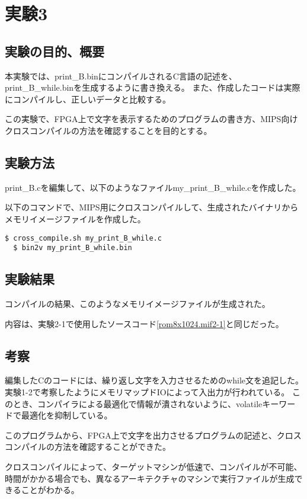 \section{実験3}
\subsection{実験の目的、概要}
本実験では、print\_B.binにコンパイルされるC言語の記述を、print\_B\_while.binを生成するように書き換える。
また、作成したコードは実際にコンパイルし、正しいデータと比較する。

この実験で、FPGA上で文字を表示するためのプログラムの書き方、MIPS向けクロスコンパイルの方法を確認することを目的とする。

\subsection{実験方法}
print\_B.cを編集して、以下のようなファイルmy\_print\_B\_while.cを作成した。


以下のコマンドで、MIPS用にクロスコンパイルして、生成されたバイナリからメモリイメージファイルを作成した。

\begin{lstlisting}[caption={クロスコンパイル},label={クロスコンパイル}]
  $ cross_compile.sh my_print_B_while.c
  $ bin2v my_print_B_while.bin
\end{lstlisting}

\subsection{実験結果}
コンパイルの結果、このようなメモリイメージファイルが生成された。


内容は、実験2-1で使用したソースコード\ref{rom8x1024.mif2-1}と同じだった。

\subsection{考察}
編集したCのコードには、繰り返し文字を入力させるためのwhile文を追記した。
実験1-2で考察したようにメモリマップドIOによって入出力が行われている。
このとき、コンパイラによる最適化で情報が潰されないように、volatileキーワードで最適化を抑制している。

このプログラムから、FPGA上で文字を出力させるプログラムの記述と、クロスコンパイルの方法を確認することができた。

クロスコンパイルによって、ターゲットマシンが低速で、コンパイルが不可能、時間がかかる場合でも、異なるアーキテクチャのマシンで実行ファイルが生成できることがわかる。
